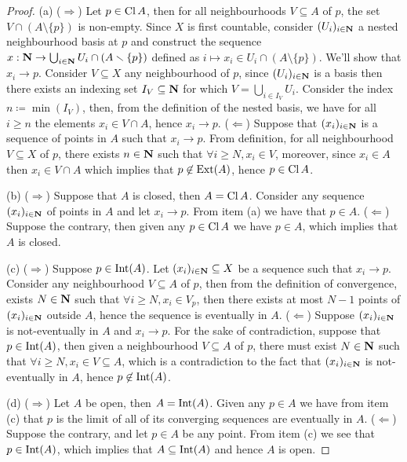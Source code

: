 \begin{proof}
(a) (\(\Rightarrow\)) Let \(p \in \operatorname{Cl} A\), then for all neighbourhoods
\(V \subseteq A\) of \(p\), the set \(V \cap (A \setminus \{p\})\) is
non-empty. Since \(X\) is first countable, consider \((U_i)_{i \in \mathbf{N}}\) a nested
neighbourhood basis at \(p\) and construct the sequence \(x : \mathbf{N} \to \bigcup_{i
\in \mathbf{N}} U_i \cap (A \smallsetminus \{p\}) \) defined as \(i \mapsto x_i \in U_i \cap
(A \setminus \{p\})\). We'll show that \(x_i \to p\). Consider \(V \subseteq X\)
any neighbourhood of \(p\), since \((U_i)_{i \in \mathbf{N}}\) is a basis then there
exists an indexing set \(I_{V} \subseteq \mathbf{N}\) for which \(V = \bigcup_{i \in
I_V} U_i\).  Consider the index \(n \coloneq \min(I_V)\), then, from the
definition of the nested basis, we have for all \(i \geq n\) the elements \(x_i
\in V \cap A\), hence \(x_i \to p\).
(\(\Leftarrow\)) Suppose that \((x_i)_{i \in \mathbf{N}}\) is a sequence of points in
\(A\) such that \(x_i \to p\). From definition, for all neighbourhood \(V
\subseteq X\) of \(p\), there exists \(n \in \mathbf{N}\) such that \(\forall i \geq N,
x_i \in V\), moreover, since \(x_i \in A\) then \(x_i \in V \cap A\) which
implies that \(p \not\in \operatorname{Ext}(A)\), hence \(p \in \operatorname{Cl} A\).

(b) (\(\Rightarrow\)) Suppose that \(A\) is closed, then \(A = \operatorname{Cl} A\).
Consider any sequence \((x_i)_{i \in \mathbf{N}}\) of points in \(A\) and let
\(x_i \to p\). From item (a) we have that \(p \in A\). (\(\Leftarrow\))
Suppose the contrary, then given any \(p \in \operatorname{Cl} A\) we have \(p \in
A\), which implies that \(A\) is closed.

(c) (\(\Rightarrow\)) Suppose \(p \in \operatorname{Int}(A)\). Let \((x_i)_{i \in
\mathbf{N}} \subseteq X\) be a sequence such that \(x_i \to p\). Consider any
neighbourhood \(V \subseteq A\) of \(p\), then from the definition of
convergence, exists \(N \in \mathbf{N}\) such that \(\forall i \geq N, x_i \in
V_p\), then there exists at most \(N - 1\) points of \((x_i)_{i \in
\mathbf{N}}\) outside \(A\), hence the sequence is eventually in \(A\).
(\(\Leftarrow\)) Suppose \((x_i)_{i \in \mathbf{N}}\) is not-eventually in
\(A\) and \(x_i \to p\). For the sake of contradiction, suppose that \(p \in
\operatorname{Int}(A)\), then given a neighbourhood \(V \subseteq A\) of \(p\), there must
exist \(N \in \mathbf{N}\) such that \(\forall i \geq N, x_i \in V \subseteq
A\), which is a contradiction to the fact that \((x_i)_{i \in \mathbf{N}}\) is
not-eventually in \(A\), hence \(p \not\in \operatorname{Int}(A)\).

(d) (\(\Rightarrow\)) Let \(A\) be open, then \(A = \operatorname{Int}(A)\). Given any \(p
\in A\) we have from item (c) that \(p\) is the limit of all of its converging
sequences are eventually in \(A\). (\(\Leftarrow\)) Suppose the contrary, and
let \(p \in A\) be any point. From item (c) we see that \(p \in \operatorname{Int}(A)\),
which implies that \(A \subseteq \operatorname{Int}(A)\) and hence \(A\) is open.
\end{proof}

